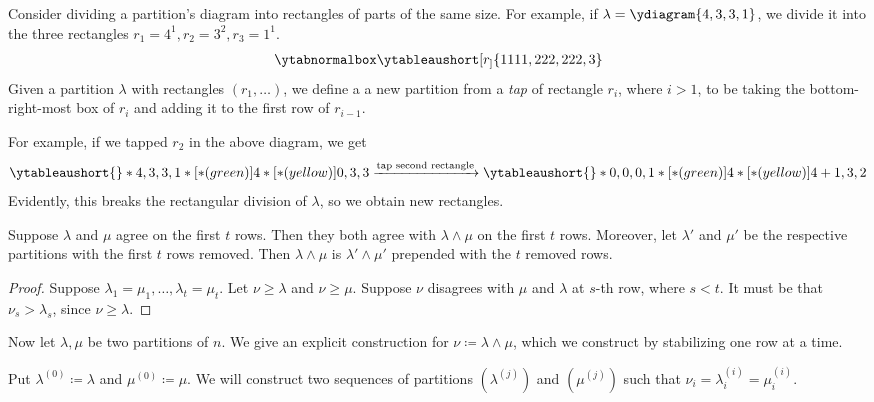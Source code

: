 \documentclass{article}
\begin{document}
Consider dividing a partition's diagram into rectangles of parts of the same size. For example, if $\lambda = \ydiagram{4,3,3,1}$, we divide it into the three rectangles $r_1 = 4^1, r_2 = 3^2, r_3 = 1^1$.
\[
    \ytabnormalbox
    \ytableaushort[r_]{1111,222,222,3}
\]
Given a partition $\lambda$ with rectangles $(r_1, \ldots)$, we define a a new partition from a \textit{tap} of rectangle $r_i$, where $i > 1$, to be taking the bottom-right-most box of $r_i$ and adding it to the first row of $r_{i-1}$.

For example, if we tapped $r_2$ in the above diagram, we get
\[
    \ytableaushort{}*{4,3,3,1}*[*(green)]{4}*[*(yellow)]{0,3,3}
    \xrightarrow{\text{tap second rectangle}} 
    \ytableaushort{}*{0,0,0,1}*[*(green)]{4}*[*(yellow)]{4+1,3,2}
\]
Evidently, this breaks the rectangular division of $\lambda$, so we obtain new rectangles.

\begin{lemma}
    Suppose $\lambda$ and $\mu$ agree on the first $t$ rows. Then they both agree with $\lambda \wedge \mu$ on the first $t$ rows. Moreover, let $\lambda'$ and $\mu'$ be the respective partitions with the first $t$ rows removed. Then $\lambda \wedge \mu$ is $\lambda' \wedge \mu'$ prepended with the $t$ removed rows.
\end{lemma}
\begin{proof}
    Suppose $\lambda_1 = \mu_1, \ldots, \lambda_t = \mu_t$.
    Let $\nu \geq \lambda$ and $\nu \geq \mu$.
    Suppose $\nu$ disagrees with $\mu$ and $\lambda$ at $s$-th row, where $s < t$.
    It must be that $\nu_s > \lambda_s$, since $\nu \geq \lambda$. 
\end{proof}

Now let $\lambda, \mu$ be two partitions of $n$. 
We give an explicit construction for $\nu \coloneq \lambda \wedge \mu$, which we construct by stabilizing one row at a time.

Put $\lambda^{(0)} \coloneq \lambda$ and $\mu^{(0)} \coloneq \mu$. We will construct two sequences of partitions $(\lambda^{(j)})$ and $(\mu^{(j)})$ such that $\nu_i = \lambda^{(i)}_i = \mu^{(i)}_i$.
\end{document}
